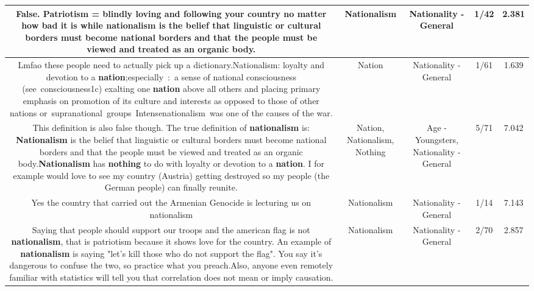 \documentclass[11pt]{article}
\newlength\mylength
\begin{document}
\begin{center}
\begin{longtable}{|C{.65\mylength}|C{.30\mylength}|C{.12\mylength}|C{.12\mylength}|C{.12\mylength}|}
  \small False. Patriotism = blindly loving and following your country no matter how bad it is while \textbf{nationalism} is the belief that linguistic or cultural borders must become national borders and that the people must be viewed and treated as an organic body.\normalsize   & Nationalism & Nationality - General & 1/42 & 2.381 \\  \hline
  \small Lmfao these people need to actually pick up a dictionary.Nationalism: loyalty and devotion to a \textbf{nation};especially : a sense of national consciousness (see consciousness1c) exalting one \textbf{nation} above all others and placing primary emphasis on promotion of its culture and interests as opposed to those of other nations or supranational groups Intensenationalism was one of the causes of the war.\normalsize   & Nation & Nationality - General & 1/61 & 1.639 \\  \hline
  \small This definition is also false though. The true definition of \textbf{nationalism} is: \textbf{Nationalism} is the belief that linguistic or cultural borders must become national borders and that the people must be viewed and treated as an organic body.\textbf{Nationalism} has \textbf{nothing} to do with loyalty or devotion to a \textbf{nation}. I for example would love to see my country (Austria) getting destroyed so my people (the German people) can finally reunite.\normalsize   & Nation, Nationalism, Nothing & Age - Youngsters, Nationality - General & 5/71 & 7.042 \\  \hline
  \small Yes the country that carried out the Armenian Genocide is lecturing us on nationalism\normalsize   & Nationalism & Nationality - General & 1/14 & 7.143 \\  \hline
  \small Saying that people should support our troops and the american flag is not \textbf{nationalism}, that is patriotism because it shows love for the country. An example of \textbf{nationalism} is saying "let's kill those who do not support the flag". You say it's dangerous to confuse the two, so practice what you preach.Also, anyone even remotely familiar with statistics will tell you that correlation does not mean or imply causation.\normalsize   & Nationalism & Nationality - General & 2/70 & 2.857 \\  \hline

\end{longtable}
\end{center}
\end{document}
